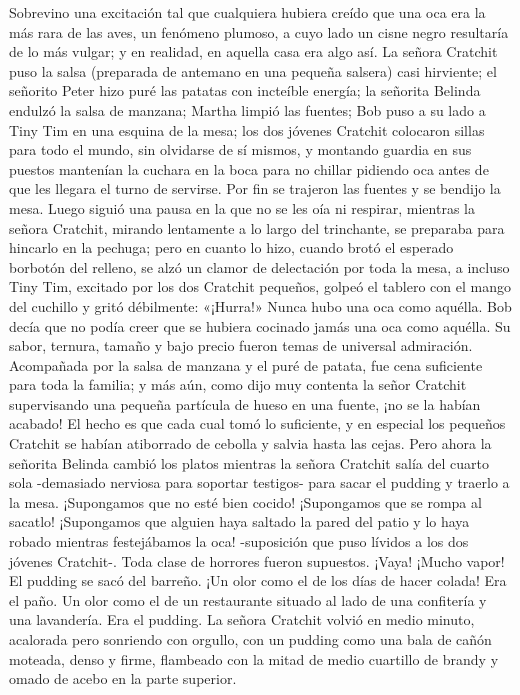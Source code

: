 \documentclass{novela}
\begin{document}
 Sobrevino una excitación tal que cualquiera hubiera creído que una oca era la más rara de las aves, un fenómeno plumoso, a cuyo lado un cisne negro resultaría de lo más vulgar; y en realidad, en aquella casa era algo así. La señora Cratchit puso la salsa (preparada de antemano en una pequeña salsera) casi hirviente; el señorito Peter hizo puré las patatas con incteíble energía; la señorita Belinda endulzó la salsa de manzana; Martha limpió las fuentes; Bob puso a su lado a Tiny Tim en una esquina de la mesa; los dos jóvenes Cratchit colocaron sillas para todo el mundo, sin olvidarse de sí mismos, y montando guardia en sus puestos mantenían la cuchara en la boca para no chillar pidiendo oca antes de que les llegara el turno de servirse. Por fin se trajeron las fuentes y se bendijo la mesa. Luego siguió una pausa en la que no se les oía ni respirar, mientras la señora Cratchit, mirando lentamente a lo largo del trinchante, se preparaba para hincarlo en la pechuga; pero en cuanto lo hizo, cuando brotó el esperado borbotón del relleno, se alzó un clamor de delectación por toda la mesa, a incluso Tiny Tim, excitado por los dos Cratchit pequeños, golpeó el tablero con el mango del cuchillo y gritó débilmente: «¡Hurra!»
 Nunca hubo una oca como aquélla. Bob decía que no podía creer que se hubiera cocinado jamás una oca como aquélla. Su sabor, ternura, tamaño y bajo precio fueron temas de universal admiración. Acompañada por la salsa de manzana y el puré de patata, fue cena suficiente para toda la familia; y más aún, como dijo muy contenta la señor Cratchit supervisando una pequeña partícula de hueso en una fuente, ¡no se la habían acabado! El hecho es que cada cual tomó lo suficiente, y en especial los pequeños Cratchit se habían atiborrado de cebolla y salvia hasta las cejas. Pero ahora la señorita Belinda cambió los platos mientras la señora Cratchit salía del cuarto sola -demasiado nerviosa para soportar testigos- para sacar el pudding y traerlo a la mesa.
 ¡Supongamos que no esté bien cocido! ¡Supongamos que se rompa al sacatlo! ¡Supongamos que alguien haya saltado la pared del patio y lo haya robado mientras festejábamos la oca! -suposición que puso lívidos a los dos jóvenes Cratchit-. Toda clase de horrores fueron supuestos.
 ¡Vaya! ¡Mucho vapor! El pudding se sacó del barreño. ¡Un olor como el de los días de hacer colada! Era el paño. Un olor como el de un restaurante situado al lado de una confitería y una lavandería. Era el pudding. La señora Cratchit volvió en medio minuto, acalorada pero sonriendo con orgullo, con un pudding como una bala de cañón moteada, denso y firme, flambeado con la mitad de medio cuartillo de brandy y omado de acebo en la parte superior.
\end{document}
